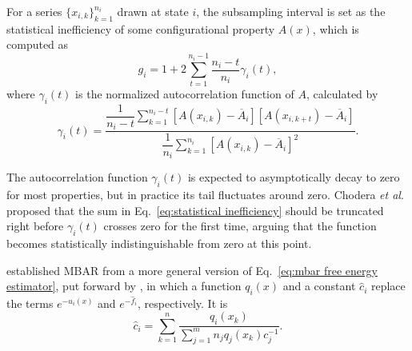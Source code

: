 \documentclass[journal=jctcce,manuscript=article,layout=twocolumn]{achemso}
\begin{document}
For a series $\{x_{i,k}\}_{k=1}^{n_i}$ drawn at state $i$, the subsampling interval is set as the statistical inefficiency of some configurational property $A(x)$, which is computed as\cite{Chodera_2007}
\begin{equation}
\label{eq:statistical inefficiency}
g_i = 1 + 2 \sum\limits_{t=1}^{n_i-1} \frac{n_i - t}{n_i} \gamma_i(t),
\end{equation}
where $\gamma_i(t)$ is the normalized autocorrelation function of $A$, calculated by
\begin{equation*}
\gamma_i(t) = \frac{\dfrac{1}{n_i - t} \sum\limits_{k=1}^{n_i-t} \left[A(x_{i,k}) - \overline A_i\right]\left[A(x_{i,k+t}) - \overline A_i\right]}{\dfrac{1}{n_i} \sum\limits_{k=1}^{n_i} \left[A(x_{i,k}) - \overline A_i\right]^2}.
\end{equation*}

The autocorrelation function $\gamma_i(t)$ is expected to asymptotically decay to zero for most properties, but in practice its tail fluctuates around zero. Chodera \textit{et al}.\cite{Chodera_2007} proposed that the sum in Eq.~\eqref{eq:statistical inefficiency} should be truncated right before $\gamma_i(t)$ crosses zero for the first time, arguing that the function becomes statistically indistinguishable from zero at this point.

\citeauthor{Shirts_2008} \cite{Shirts_2008} established MBAR from a more general version of Eq.~\eqref{eq:mbar free energy estimator}, put forward by \citeauthor{Kong_2003} \cite{Kong_2003}, in which a function $q_i(x)$ and a constant $\hat c_i$ replace the terms $e^{-u_i(x)}$ and $e^{-\hat f_i}$, respectively. It is
\begin{equation}
\label{eq:mbar general estimator}
{\hat c}_i = \sum_{k=1}^n \frac{q_i(x_k)}{\sum_{j=1}^m n_j q_j(x_k) c_j^{-1}}.
\end{equation}
\end{document}
